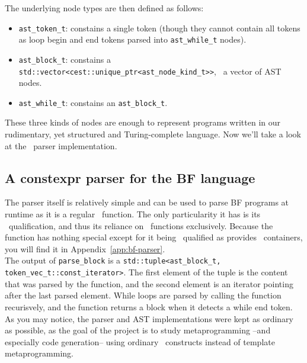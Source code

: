 \documentclass[../../main.tex]{subfiles}
\begin{document}
\clearpage%

% 

The underlying node types are then defined as follows:

\begin{itemize}
\item \lstinline|ast_token_t|: constains a single token (though they cannot
      contain all tokens as loop begin and end tokens parsed into
      \lstinline|ast_while_t| nodes).
\item \lstinline|ast_block_t|: constains a
      \lstinline|std::vector<cest::unique_ptr<ast_node_kind_t>>|, \ie~a vector
      of AST nodes.
\item \lstinline|ast_while_t|: constains an \lstinline|ast_block_t|.
\end{itemize}

These three kinds of nodes are enough to represent programs written in our
rudimentary, yet structured and Turing-complete language. Now we'll take a look
at the \constexpr~parser implementation.

\subsection{A constexpr parser for the BF language}

The parser itself is relatively simple and can be used to parse BF programs at
runtime as it is a regular \cpp~function. The only particularity it has is its
\constexpr~qualification, and thus its reliance on \constexpr~functions
exclusively. Because the function has nothing special except for it being
\constexpr~qualified as  provides
\constexpr~containers\cite{more-constexpr-containers}, you will find it in
Appendix~\ref{app:bf-parser}.\\

The output of \lstinline|parse_block| is a
\lstinline|std::tuple<ast_block_t, token_vec_t::const_iterator>|. The first
element of the tuple is the content that was parsed by the function, and the
second element is an iterator pointing after the last parsed element. While
loops are parsed by calling the function recurisvely, and the function returns a
block when it detects a while end token. As you may notice, the parser and AST
implementations were kept as ordinary as possible, as the goal of the
project is to study metaprogramming --and especially code generation-- using
ordinary \cpp~constructs instead of template metaprogramming.\\
\end{document}
